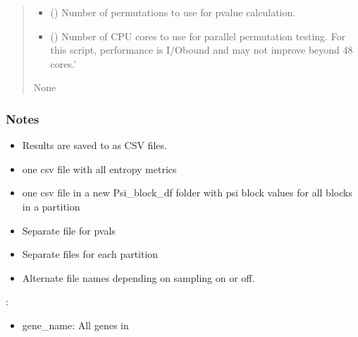 \documentclass[letterpaper,10pt,english]{sphinxmanual}
\begin{document}
\begin{fulllineitems}
\begin{quote}
\begin{description}
\begin{itemize}
\item {} 
\sphinxAtStartPar
{} (\sphinxstyleliteralemphasis{\sphinxupquote{, }}) \textendash{} Number of permutations to use for p\sphinxhyphen{}value calculation.

\item {} 
\sphinxAtStartPar
{} (\sphinxstyleliteralemphasis{\sphinxupquote{, }}) \textendash{} Number of CPU cores to use for parallel permutation testing.
For this script, performance is I/O\sphinxhyphen{}bound and may not improve beyond 4\sphinxhyphen{}8 cores.’

\end{itemize}

\sphinxAtStartPar
None

\end{description}\end{quote}
\subsubsection*{Notes}
\begin{itemize}
\item {} 
\sphinxAtStartPar
Results are saved to  as CSV files.

\item {} 
\sphinxAtStartPar
one csv file with all entropy metrics

\item {} 
\sphinxAtStartPar
one csv file in a new Psi\_block\_df folder with psi block values for all blocks in a partition

\item {} 
\sphinxAtStartPar
Separate file for pvals

\item {} 
\sphinxAtStartPar
Separate files for each partition

\item {} 
\sphinxAtStartPar
Alternate file names depending on sampling on or off.

\end{itemize}

\sphinxAtStartPar
{}:
\begin{itemize}
\item {} 
\sphinxAtStartPar
gene\_name: All genes in 


\end{itemize}
\end{fulllineitems}
\end{document}
